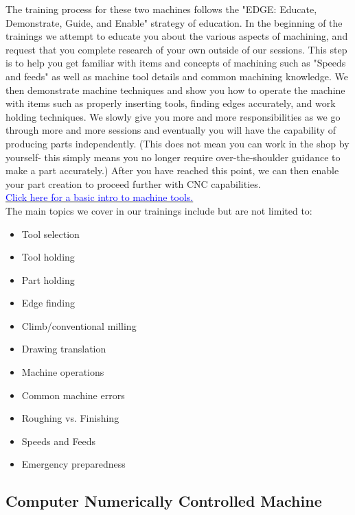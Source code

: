 \documentclass{article}
\begin{document}
The training process for these two machines follows the "EDGE: Educate, Demonstrate, Guide, and Enable" strategy of education. In the beginning of the trainings we attempt to educate you about the various aspects of machining, and request that you complete research of your own outside of our sessions. This step is to help you get familiar with items and concepts of machining such as "Speeds and feeds" as well as machine tool details and common machining knowledge. We then demonstrate machine techniques and show you how to operate the machine with items such as properly inserting tools, finding edges accurately, and work holding techniques. We slowly give you more and more responsibilities as we go through more and more sessions and eventually you will have the capability of producing parts independently. (This does not mean you can work in the shop by yourself- this simply means you no longer require over-the-shoulder guidance to make a part accurately.) After you have reached this point, we can then enable your part creation to proceed further with CNC capabilities.  \\

\href{https://autode.sk/2Bfp6qI}{\textcolor{blue}{Click here for a basic intro to machine tools.}} \\

The main topics we cover in our trainings include but are not limited to:
\begin{itemize}
    \item Tool selection
    \item Tool holding
    \item Part holding
    \item Edge finding
    \item Climb/conventional milling
    \item Drawing translation
    \item Machine operations
    \item Common machine errors
    \item Roughing vs. Finishing
    \item Speeds and Feeds
    \item Emergency preparedness
\end{itemize}


\subsection{Computer Numerically Controlled Machine}
\end{document}
